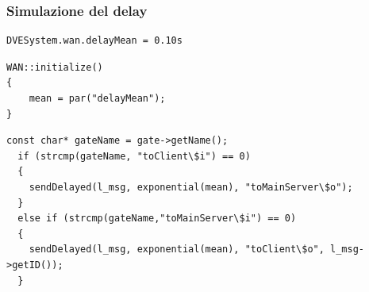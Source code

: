 \begin{frame}[fragile]
\frametitle{Simulazione del delay}
\begin{lstlisting}[title = {\texttt{omnetpp.ini}: definizione della media},
                  ]
DVESystem.wan.delayMean = 0.10s
\end{lstlisting}

\begin{lstlisting}[title = {\texttt{WAN.cc}: inizializzazione della media},
                  ]
WAN::initialize()
{
    mean = par("delayMean");
}
\end{lstlisting}

\begin{lstlisting}[title = {\texttt{WAN.cc}: tipico meccanismo di routing},
                  ]
  const char* gateName = gate->getName();
  if (strcmp(gateName, "toClient\$i") == 0)
  {
    sendDelayed(l_msg, exponential(mean), "toMainServer\$o");
  }
  else if (strcmp(gateName,"toMainServer\$i") == 0)
  {
    sendDelayed(l_msg, exponential(mean), "toClient\$o", l_msg->getID());
  }
\end{lstlisting}
\end{frame}


